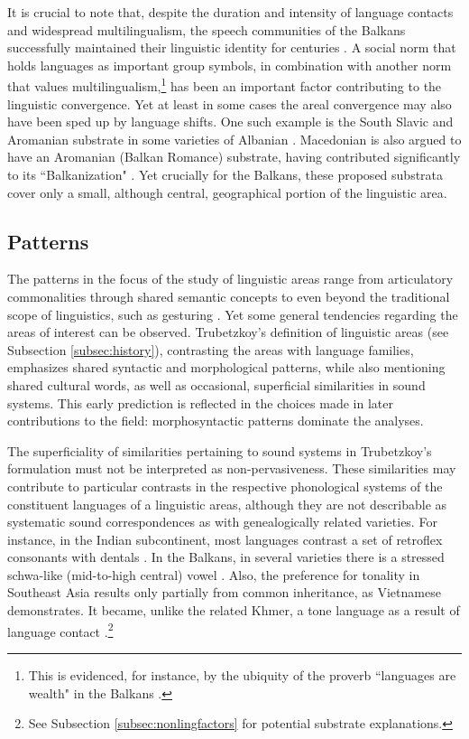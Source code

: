 \documentclass[output=paper]{langscibook}
\begin{document}
It is crucial to note that, despite the duration and intensity of language contacts and widespread multilingualism, the speech communities of the Balkans successfully maintained their linguistic identity for centuries \parencite[see, e.g.,][625]{joseph2010}. A social norm that holds languages as important group symbols, in combination with another norm that values multilingualism,\footnote{This is evidenced, for instance, by the ubiquity of the proverb ``languages are wealth" in the Balkans \parencite[163]{friedman12}.} has been an important factor contributing to the linguistic convergence. Yet at least in some cases the areal convergence may also have been sped up by language shifts. One such example is the South Slavic and Aromanian substrate in some varieties of Albanian \parencite[258--260]{RefWorks:desnickaja68}. Macedonian is also argued to have an Aromanian (Balkan Romance) substrate, having contributed significantly to its ``Balkanization" \parencite{Golab97}. Yet crucially for the Balkans, these proposed substrata cover only a small, although central, geographical portion of the linguistic area.  


\subsection{Patterns}
\label{sec:patterns}

The patterns in the focus of the study of linguistic areas range from articulatory commonalities through shared semantic concepts to even beyond the traditional scope of linguistics, such as gesturing \parencite[for the latter, see][196]{enfield2005}. Yet some general tendencies regarding the areas of interest can be observed. Trubetzkoy's definition of linguistic areas (see Subsection \ref{subsec:history}), contrasting the areas with language families, emphasizes  shared syntactic and morphological patterns, while also mentioning shared cultural words, as well as occasional, superficial similarities in sound systems. This early prediction is reflected in the choices made in later contributions to the field: morphosyntactic patterns dominate the analyses.  

The superficiality of similarities pertaining to sound systems in Trubetzkoy's \parencite*{trubetzkoy28} formulation must not be interpreted as non-pervasiveness. These similarities may contribute to particular contrasts in the respective phonological systems of the constituent languages of a linguistic areas, although they are not describable as systematic sound correspondences as with genealogically related varieties. For instance, in the Indian subcontinent, most languages contrast a set of retroflex consonants with dentals \parencite[7]{emeneau56}. In the Balkans, in several varieties there is a stressed schwa-like (mid-to-high central) vowel \parencite[28–30]{asenova2002}. Also, the preference for tonality in Southeast Asia results only partially from common inheritance, as Vietnamese demonstrates. It became, unlike the related Khmer, a tone language as a result of language contact \parencite[191]{enfield2005}.\footnote{See Subsection \ref{subsec:nonlingfactors} for potential substrate explanations.}
\end{document}
